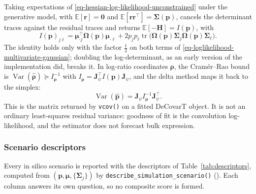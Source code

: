 \begin{remark}
  \label{pr:decovart-expected-fisher}
  Taking expectations of \eqref{eq-hessian-log-likelihood-unconstrained} under the generative model,
  with \(\mathbb{E}[\boldsymbol{r}]=\boldsymbol{0}\) and \(\mathbb{E}[\boldsymbol{r}\boldsymbol{r}^{\top}]=\boldsymbol{\Sigma}(\boldsymbol{p})\), cancels the
  determinant traces against the residual traces and returns \(\mathbb{E}[-\mathbf{H}]=I(\boldsymbol{p})\), with
  \begin{equation}
    I(\boldsymbol{p})_{j\ell}
    =\boldsymbol{\mu}_{\cdot j}^{\top}\boldsymbol{\Omega}(\boldsymbol{p})\boldsymbol{\mu}_{\cdot\ell}
    +2p_{j}p_{\ell}\operatorname{tr}\bigl(\boldsymbol{\Omega}(\boldsymbol{p})\boldsymbol{\Sigma}_{j}\boldsymbol{\Omega}(\boldsymbol{p})\boldsymbol{\Sigma}_{\ell}\bigr).
    \label{eq-expected-fisher-p}
  \end{equation}
  The identity holds only with the factor \(\tfrac12\) on both terms of
  \eqref{eq-loglikelihood-multivariate-gaussian}; doubling the log-determinant, as an early version of
  the implementation did, breaks it.
  In log-ratio coordinates \(\boldsymbol{\rho}\), the Cram\'er--Rao bound is
  \(\operatorname{Var}(\hat{\boldsymbol{\rho}})\succeq I_{\boldsymbol{\rho}}^{-1}\) with
  \(I_{\boldsymbol{\rho}}=\mathbf{J}_{\psi}^{\top}I(\boldsymbol{p})\mathbf{J}_{\psi}\), and the delta method maps it back to the
  simplex:
  \begin{equation}
    \operatorname{Var}(\hat{\boldsymbol{p}})=\mathbf{J}_{\psi}I_{\boldsymbol{\rho}}^{-1}\mathbf{J}_{\psi}^{\top}.
    \label{eq-delta-method-p}
  \end{equation}
  This is the matrix returned by \texttt{vcov()} on a fitted DeCovarT object.
  It is not an ordinary least-squares residual variance: goodness of fit is the convolution
  log-likelihood, and the estimator does not forecast bulk expression.
\end{remark}

\subsubsection{Scenario descriptors}
\label{app:descriptors}

Every in silico scenario is reported with the descriptors of Table~\ref{tab:descriptors}, computed from
\((\boldsymbol{p},\boldsymbol{\mu},\{\boldsymbol{\Sigma}_{j}\})\) by \texttt{describe\_simulation\_scenario()}
(). Each
column answers its own question, so no composite score is formed.

